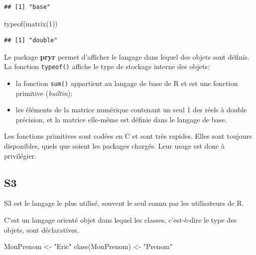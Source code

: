 \documentclass[
  11pt,
  french,
  a4paper,
  extrafontsizes,onecolumn,openright
  ]{memoir}
\newenvironment{Shaded}{\begin{snugshade}}{\end{snugshade}}
\newcommand{\DecValTok}[1]{\textcolor[rgb]{0.00,0.00,0.81}{#1}}
\newcommand{\FunctionTok}[1]{\textcolor[rgb]{0.00,0.00,0.00}{#1}}
\newcommand{\NormalTok}[1]{#1}
\newcommand{\OtherTok}[1]{\textcolor[rgb]{0.56,0.35,0.01}{#1}}
\newcommand{\StringTok}[1]{\textcolor[rgb]{0.31,0.60,0.02}{#1}}
\providecommand{\tightlist}{%
  \setlength{\itemsep}{0pt}\setlength{\parskip}{0pt}}
\begin{document}
\begin{verbatim}
## [1] "base"
\end{verbatim}

\begin{Shaded}
\begin{Highlighting}[]
\FunctionTok{typeof}\NormalTok{(}\FunctionTok{matrix}\NormalTok{(}\DecValTok{1}\NormalTok{))}
\end{Highlighting}
\end{Shaded}

\begin{verbatim}
## [1] "double"
\end{verbatim}

\normalsize

Le package \textbf{pryr} permet d'afficher le langage dans lequel des objets sont définis.
La fonction \texttt{typeof()} affiche le type de stockage interne des objets:

\begin{itemize}
\tightlist
\item
  la fonction \texttt{sum()} appartient au langage de base de R et est une fonction primitive (\emph{builtin});
\item
  les éléments de la matrice numérique contenant un seul 1 des réels à double précision, et la matrice elle-même est définie dans le langage de base.
\end{itemize}

Les fonctions primitives sont codées en C et sont très rapides.
Elles sont toujours disponibles, quels que soient les packages chargés.
Leur usage est donc à privilégier.

\hypertarget{sec:S3}{%
\subsection{S3}\label{sec:S3}}

S3 est le langage le plus utilisé, souvent le seul connu par les utilisateurs de R.

C'est un langage orienté objet dans lequel les classes, c'est-è-dire le type des objets, sont déclaratives.

\scriptsize

\begin{Shaded}
\begin{Highlighting}[]
\NormalTok{MonPrenom }\OtherTok{\textless{}{-}} \StringTok{"Eric"}
\FunctionTok{class}\NormalTok{(MonPrenom) }\OtherTok{\textless{}{-}} \StringTok{"Prenom"}
\end{Highlighting}
\end{Shaded}
\end{document}
